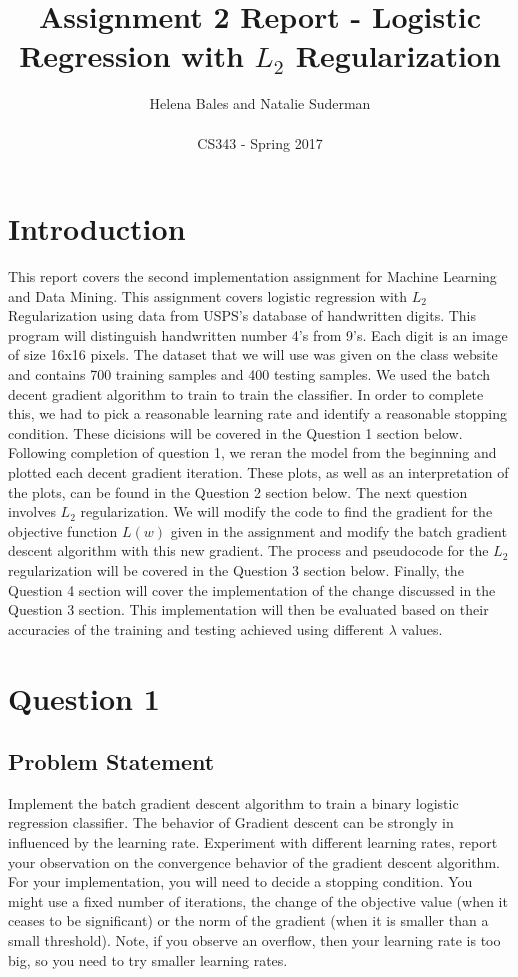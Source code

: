 \documentclass[letterpaper,10pt]{article}
\title{Assignment 2 Report - Logistic Regression with \(L_2\) Regularization}
\author{Helena Bales and Natalie Suderman\\ \\ CS343 - Spring 2017}
\begin{document}
\maketitle

\tableofcontents
\clearpage

\section{Introduction}
This report covers the second implementation assignment for Machine Learning and Data Mining. This 
assignment covers logistic regression with \(L_2\) Regularization using data from USPS's database of 
handwritten digits. This program will distinguish handwritten number 4's from 9's. Each digit is an 
image of size 16x16 pixels. The dataset that we will use was given on the class website and contains 
700 training samples and 400 testing samples. We used the batch decent gradient algorithm to train 
to train the classifier. In order to complete this, we had to pick a reasonable learning rate and 
identify a reasonable stopping condition. These dicisions will be covered in the Question 1 section 
below. Following completion of question 1, we reran the model from the beginning and plotted each 
decent gradient iteration. These plots, as well as an interpretation of the plots, can be found in 
the Question 2 section below. The next question involves \(L_2\) regularization. We will modify the 
code to find the gradient for the objective function \(L(w)\) given in the assignment and modify the 
batch gradient descent algorithm with this new gradient. The process and pseudocode for the \(L_2\) 
regularization will be covered in the Question 3 section below. Finally, the Question 4 section will 
cover the implementation of the change discussed in the Question 3 section. This implementation will 
then be evaluated based on their accuracies of the training and testing achieved using different 
\(\lambda\) values.

\section{Question 1}
\subsection{Problem Statement}
Implement the batch gradient descent algorithm to train a binary logistic regression classifier. 
The behavior of Gradient descent can be strongly in influenced by the learning rate. Experiment with 
different learning rates, report your observation on the convergence behavior of the gradient 
descent algorithm. For your implementation, you will need to decide a stopping condition. You might 
use a fixed number of iterations, the change of the objective value (when it ceases to be 
significant) or the norm of the gradient (when it is smaller than a small threshold). Note, if you 
observe an overflow, then your learning rate is too big, so you need to try smaller learning rates.
\end{document}
